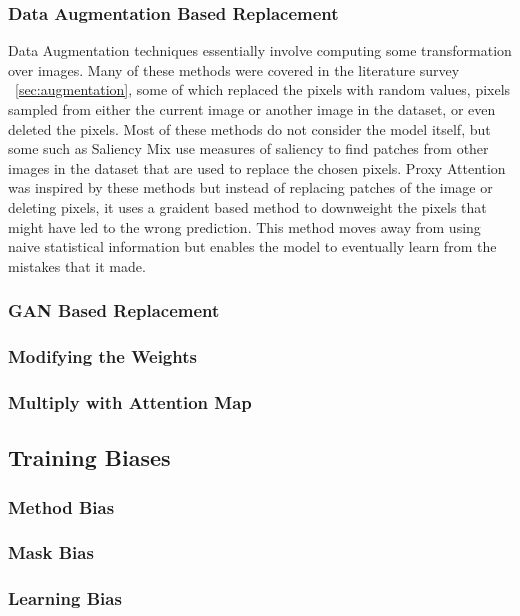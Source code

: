 \subsubsection{Data Augmentation Based Replacement}
Data Augmentation techniques essentially involve computing some transformation over images. Many of these methods were covered in the literature survey ~\ref{sec:augmentation}, some of which replaced the pixels with random values, pixels sampled from either the current image or another image in the dataset, or even deleted the pixels. Most of these methods do not consider the model itself, but some such as Saliency Mix \cite{uddinSaliencyMixSaliencyGuided2021} use measures of saliency to find patches from other images in the dataset that are used to replace the chosen pixels. 
Proxy Attention was inspired by these methods but instead of replacing patches of the image or deleting pixels, it uses a graident based method to downweight the pixels that might have led to the wrong prediction. This method moves away from using naive statistical information but enables the model to eventually learn from the mistakes that it made.

\subsubsection{GAN Based Replacement}

\subsubsection{Modifying the Weights}

\subsubsection{Multiply with Attention Map}

\subsection{Training Biases}
\subsubsection{Method Bias}
\subsubsection{Mask Bias}
\subsubsection{Learning Bias}
